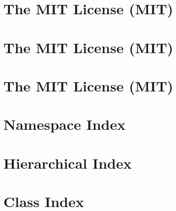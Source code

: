\documentclass[twoside]{book}
\newcommand{\+}{\discretionary{\mbox{\scriptsize$\hookleftarrow$}}{}{}}
\begin{document}
\chapter{The MIT License (MIT)}
\label{md__d___source_shev4enkoyar__digital_twin__web_client_obj__release_netcoreapp3_1_win_x86__pub_tm45833fc5ba6eb55e5a196a00eba2af03}

\chapter{The MIT License (MIT)}
\label{md__d___source_shev4enkoyar__digital_twin__web_client_obj__release_netcoreapp3_1_win_x86__pub_tm085dddbb15aa216f4150a7f98638571a}

\chapter{The MIT License (MIT)}
\label{md__d___source_shev4enkoyar__digital_twin__web_client_wwwroot_lib_jquery_validation__l_i_c_e_n_s_e}

\chapter{Namespace Index}

\chapter{Hierarchical Index}

\chapter{Class Index}

\end{document}
